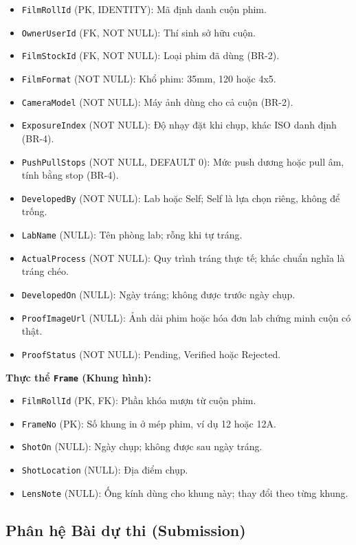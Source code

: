 \begin{itemize}
    \item \texttt{FilmRollId} (PK, IDENTITY): Mã định danh cuộn phim.
    \item \texttt{OwnerUserId} (FK, NOT NULL): Thí sinh sở hữu cuộn.
    \item \texttt{FilmStockId} (FK, NOT NULL): Loại phim đã dùng (BR-2).
    \item \texttt{FilmFormat} (NOT NULL): Khổ phim: 35mm, 120 hoặc 4x5.
    \item \texttt{CameraModel} (NOT NULL): Máy ảnh dùng cho cả cuộn (BR-2).
    \item \texttt{ExposureIndex} (NOT NULL): Độ nhạy đặt khi chụp, khác ISO danh định (BR-4).
    \item \texttt{PushPullStops} (NOT NULL, DEFAULT 0): Mức push dương hoặc pull âm, tính bằng stop (BR-4).
    \item \texttt{DevelopedBy} (NOT NULL): Lab hoặc Self; Self là lựa chọn riêng, không để trống.
    \item \texttt{LabName} (NULL): Tên phòng lab; rỗng khi tự tráng.
    \item \texttt{ActualProcess} (NOT NULL): Quy trình tráng thực tế; khác chuẩn nghĩa là tráng chéo.
    \item \texttt{DevelopedOn} (NULL): Ngày tráng; không được trước ngày chụp.
    \item \texttt{ProofImageUrl} (NULL): Ảnh dải phim hoặc hóa đơn lab chứng minh cuộn có thật.
    \item \texttt{ProofStatus} (NOT NULL): Pending, Verified hoặc Rejected.
\end{itemize}

\noindent\textbf{Thực thể \texttt{Frame} (Khung hình):}

\begin{itemize}
    \item \texttt{FilmRollId} (PK, FK): Phần khóa mượn từ cuộn phim.
    \item \texttt{FrameNo} (PK): Số khung in ở mép phim, ví dụ 12 hoặc 12A.
    \item \texttt{ShotOn} (NULL): Ngày chụp; không được sau ngày tráng.
    \item \texttt{ShotLocation} (NULL): Địa điểm chụp.
    \item \texttt{LensNote} (NULL): Ống kính dùng cho khung này; thay đổi theo từng khung.
\end{itemize}

\subsection{Phân hệ Bài dự thi (Submission)}

